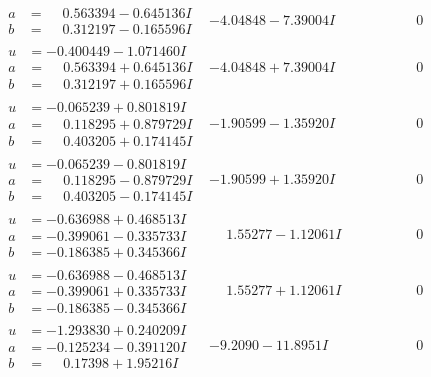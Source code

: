 \documentclass[1p]{elsarticle_modified}
\theoremstyle{definition}
\begin{document}
$$\begin{array}{c|c|c}
\begin{aligned}
a &= \phantom{-}0.563394 - 0.645136 I \\
b &= \phantom{-}0.312197 - 0.165596 I\end{aligned}
 & -4.04848 - 7.39004 I & \phantom{-0.000000 } 0 \\ \hline\begin{aligned}
u &= -0.400449 - 1.071460 I \\
a &= \phantom{-}0.563394 + 0.645136 I \\
b &= \phantom{-}0.312197 + 0.165596 I\end{aligned}
 & -4.04848 + 7.39004 I & \phantom{-0.000000 } 0 \\ \hline\begin{aligned}
u &= -0.065239 + 0.801819 I \\
a &= \phantom{-}0.118295 + 0.879729 I \\
b &= \phantom{-}0.403205 + 0.174145 I\end{aligned}
 & -1.90599 - 1.35920 I & \phantom{-0.000000 } 0 \\ \hline\begin{aligned}
u &= -0.065239 - 0.801819 I \\
a &= \phantom{-}0.118295 - 0.879729 I \\
b &= \phantom{-}0.403205 - 0.174145 I\end{aligned}
 & -1.90599 + 1.35920 I & \phantom{-0.000000 } 0 \\ \hline\begin{aligned}
u &= -0.636988 + 0.468513 I \\
a &= -0.399061 - 0.335733 I \\
b &= -0.186385 + 0.345366 I\end{aligned}
 & \phantom{-}1.55277 - 1.12061 I & \phantom{-0.000000 } 0 \\ \hline\begin{aligned}
u &= -0.636988 - 0.468513 I \\
a &= -0.399061 + 0.335733 I \\
b &= -0.186385 - 0.345366 I\end{aligned}
 & \phantom{-}1.55277 + 1.12061 I & \phantom{-0.000000 } 0 \\ \hline\begin{aligned}
u &= -1.293830 + 0.240209 I \\
a &= -0.125234 - 0.391120 I \\
b &= \phantom{-}0.17398 + 1.95216 I\end{aligned}
 & -9.2090 - 11.8951 I & \phantom{-0.000000 } 0 \\ \hline\begin{aligned}

\end{aligned}
\end{array}$$
\end{document}
